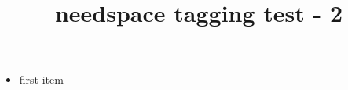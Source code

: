 \documentclass{article}
\title{needspace tagging test - 2}
\begin{document}
    \kant[11-14]
    \begin{itemize}
        \item first item
    \end{itemize}
    \kant[62-65]
\end{document}
